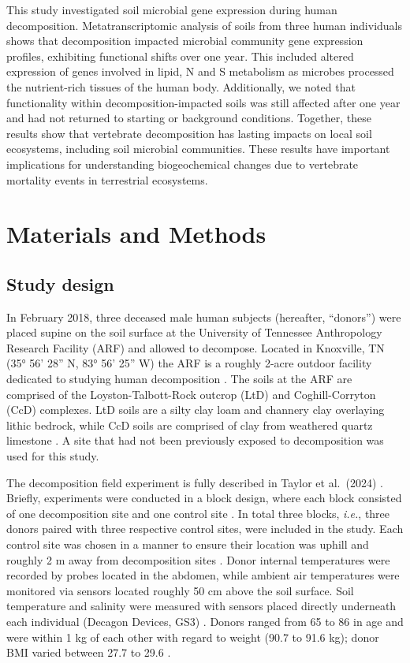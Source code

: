 \documentclass[
  sn-nature,
  lineno, referee]{sn-jnl}
\begin{document}
This study investigated soil microbial gene expression during human
decomposition. Metatranscriptomic analysis of soils from three human
individuals shows that decomposition impacted microbial community gene
expression profiles, exhibiting functional shifts over one year. This
included altered expression of genes involved in lipid, N and S
metabolism as microbes processed the nutrient-rich tissues of the human
body. Additionally, we noted that functionality within
decomposition-impacted soils was still affected after one year and had
not returned to starting or background conditions. Together, these
results show that vertebrate decomposition has lasting impacts on local
soil ecosystems, including soil microbial communities. These results
have important implications for understanding biogeochemical changes due
to vertebrate mortality events in terrestrial ecosystems.

\section{Materials and Methods}\label{materials-and-methods}

\subsection{Study design}\label{study-design}

In February 2018, three deceased male human subjects (hereafter,
``donors'') were placed supine on the soil surface at the University of
Tennessee Anthropology Research Facility (ARF) and allowed to decompose.
Located in Knoxville, TN (35° 56' 28'' N, 83° 56' 25'' W) the ARF is a
roughly 2-acre outdoor facility dedicated to studying human
decomposition \citep{keenan_spatial_2018}. The soils at the ARF are
comprised of the Loyston-Talbott-Rock outcrop (LtD) and Coghill-Corryton
(CcD) complexes. LtD soils are a silty clay loam and channery clay
overlaying lithic bedrock, while CcD soils are comprised of clay from
weathered quartz limestone
\citep{keenan_spatial_2018, taylor_transient_2024}. A site that had not
been previously exposed to decomposition was used for this study.

The decomposition field experiment is fully described in Taylor et
al.~(2024) \citep{taylor_transient_2024}. Briefly, experiments were
conducted in a block design, where each block consisted of one
decomposition site and one control site \citep{taylor_transient_2024}.
In total three blocks, \emph{i.e.}, three donors paired with three
respective control sites, were included in the study. Each control site
was chosen in a manner to ensure their location was uphill and roughly 2
m away from decomposition sites \citep{taylor_transient_2024}. Donor
internal temperatures were recorded by probes located in the abdomen,
while ambient air temperatures were monitored via sensors located
roughly 50 cm above the soil surface. Soil temperature and salinity were
measured with sensors placed directly underneath each individual
(Decagon Devices, GS3) \citep{taylor_transient_2024}. Donors ranged from
65 to 86 in age and were within 1 kg of each other with regard to weight
(90.7 to 91.6 kg); donor BMI varied between 27.7 to 29.6
\citep{taylor_transient_2024}.
\end{document}
